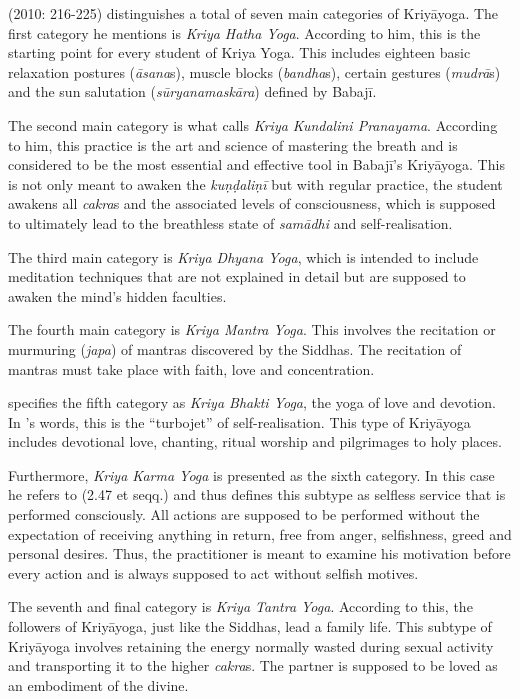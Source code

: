 \citeauthor{govindan2010} (2010: 216-225) distinguishes a total of seven main categories of Kriyāyoga. The first category he mentions is \textit{Kriya Hatha Yoga}. According to him, this is the starting point for every student of Kriya Yoga. This includes eighteen basic relaxation postures (\textit{āsana}s), muscle blocks (\textit{bandha}s), certain gestures (\textit{mudrā}s) and the sun salutation (\textit{sūryanamaskāra}) defined by Babajī.

The second main category is what \citeauthor{govindan2010} calls \textit{Kriya Kundalini Pranayama}. According to him, this practice is the art and science of mastering the breath and is considered to be the most essential and effective tool in Babajī's Kriyāyoga. This is not only meant to awaken the \textit{kuṇḍaliṇī} but with regular practice, the student awakens all \textit{cakra}s and the associated levels of consciousness, which is supposed to ultimately lead to the breathless state of \textit{samādhi} and self-realisation.

The third main category is \textit{Kriya Dhyana Yoga}, which is intended to include meditation techniques that are not explained in detail but are supposed to awaken the mind's hidden faculties.

The fourth main category is \textit{Kriya Mantra Yoga}. This involves the recitation or murmuring (\textit{japa}) of mantras discovered by the Siddhas. The recitation of mantras must take place with faith, love and concentration.

\citeauthor{govindan2010} specifies the fifth category as \textit{Kriya Bhakti Yoga}, the yoga of love and devotion. In \citeauthor{govindan2010}'s words, this is the ``turbojet'' of self-realisation. This type of Kriyāyoga includes devotional love, chanting, ritual worship and pilgrimages to holy places.

Furthermore, \textit{Kriya Karma Yoga} is presented as the sixth category. In this case he refers to  (2.47 et seqq.) and thus defines this subtype as selfless service that is performed consciously. All actions are supposed to be performed without the expectation of receiving anything in return, free from anger, selfishness, greed and personal desires. Thus, the practitioner is meant to examine his motivation before every action and is always supposed to act without selfish motives.

The seventh and final category is \textit{Kriya Tantra Yoga}. According to this, the followers of Kriyāyoga, just like the Siddhas, lead a family life. This subtype of Kriyāyoga involves retaining the energy normally wasted during sexual activity and transporting it to the higher \textit{cakra}s. The partner is supposed to be loved as an embodiment of the divine.

